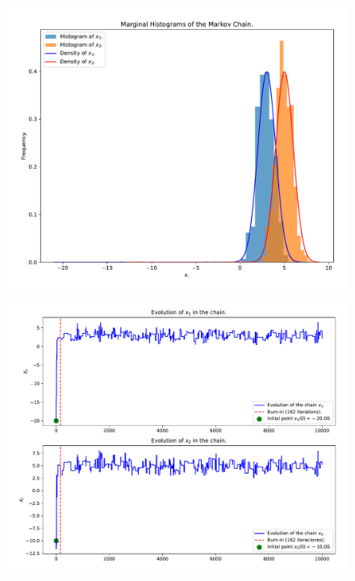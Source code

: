 \begin{figure}[h!]
	\centering
	\begin{minipage}{0.495\textwidth}
		\centering
		\includegraphics[width=\textwidth]{IMAGENES/ex3/histograms_example3.pdf}
	\end{minipage}
	\hfill
	\begin{minipage}{0.495\textwidth}
		\centering
		\includegraphics[width=\textwidth]{IMAGENES/ex3/evolution_example3.pdf}
	\end{minipage}
\end{figure}

